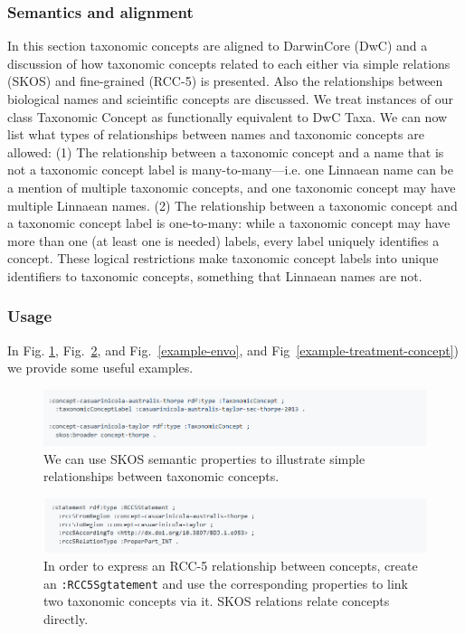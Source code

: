 \subsubsection{Semantics and alignment}

In this section taxonomic concepts are aligned to DarwinCore (DwC) and a discussion of how taxonomic concepts related to each either via simple relations (SKOS) and fine-grained (RCC-5) is presented. Also the relationships between biological names and scieintific concepts are discussed. We treat instances of our class Taxonomic Concept as functionally equivalent to DwC Taxa.  We can now list what types of relationships between names and taxonomic concepts are allowed: (1) The relationship between a taxonomic concept and a name that is not a taxonomic concept label is many-to-many---i.e. one Linnaean name can be a mention of multiple taxonomic concepts, and one taxonomic concept may have multiple Linnaean names. (2) The relationship between a taxonomic concept and a taxonomic concept label is one-to-many: while a taxonomic concept may have more than one (at least one is needed) labels, every label uniquely identifies a concept. These logical restrictions make taxonomic concept labels into unique identifiers to taxonomic concepts, something that Linnaean names are not.

\subsubsection{Usage} In Fig. \ref{example-simple-taxonomic-concept-relationships}, Fig.~\ref{example-rcc5-taxonomic-concept-relationships}, and Fig.~\ref{example-envo}, and  Fig~\ref{example-treatment-concept}) we provide some useful examples.

\begin{figure}[h!]
\centering
  \includegraphics[width=\textwidth]{Figures/example-simple-taxonomic-concept-relationships}
  \decoRule
  \caption[Example simple taxonomic concept relationships.]
  {We can use SKOS semantic properties to illustrate simple relationships between taxonomic concepts.}
  \label{example-simple-taxonomic-concept-relationships}
\end{figure}

\begin{figure}[h!]
\centering
  \includegraphics[width=\textwidth]{Figures/example-rcc5-taxonomic-concept-relationships}
  \decoRule
  \caption[Example of RCC-5 taxonomic concept relationships.]{In order to express an RCC-5 relationship between concepts, create an {\tt :RCC5Sgtatement} and use the corresponding properties to link two taxonomic concepts via it. SKOS relations relate concepts directly.}
  \label{example-rcc5-taxonomic-concept-relationships}
\end{figure}


